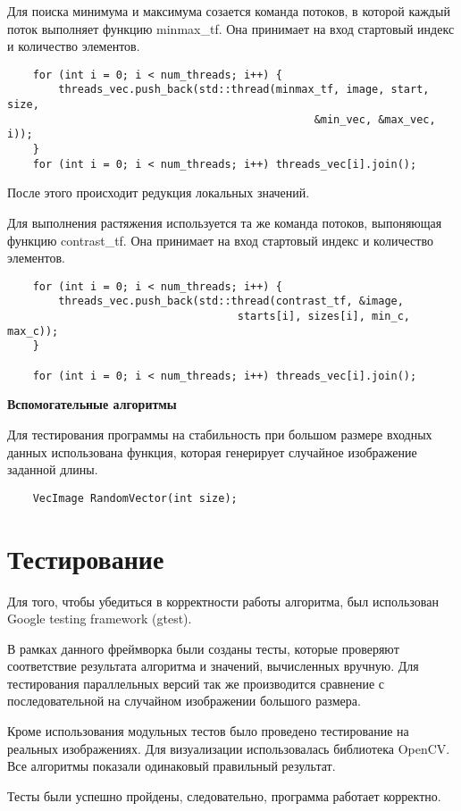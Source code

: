 \documentclass{report}
\begin{document}
    Для поиска минимума и максимума созается команда потоков, в которой каждый поток выполняет функцию minmax\_tf. Она принимает на вход стартовый индекс и количество элементов.
    \begin{lstlisting}
    for (int i = 0; i < num_threads; i++) {
        threads_vec.push_back(std::thread(minmax_tf, image, start, size,
                                                &min_vec, &max_vec, i));
    }
    for (int i = 0; i < num_threads; i++) threads_vec[i].join();
    \end{lstlisting}
    \par После этого происходит редукция локальных значений.
    \par Для выполнения растяжения используется та же команда потоков, выпоняющая функцию contrast\_tf. Она принимает на вход стартовый индекс и количество элементов.
    \begin{lstlisting}
    for (int i = 0; i < num_threads; i++) {
        threads_vec.push_back(std::thread(contrast_tf, &image,
                                    starts[i], sizes[i], min_c, max_c));
    }

    for (int i = 0; i < num_threads; i++) threads_vec[i].join();
    \end{lstlisting}
    \textbf{Вспомогательные алгоритмы}
    \par Для тестирования программы на стабильность при большом размере входных данных использована функция, которая генерирует случайное изображение заданной длины.
    \begin{lstlisting}
    VecImage RandomVector(int size);
    \end{lstlisting}
    
    \newpage
    \section*{Тестирование}
    \par Для того, чтобы убедиться в корректности работы алгоритма, был использован Google testing framework (gtest).
    \par В рамках данного фреймворка были созданы тесты, которые проверяют соответствие результата алгоритма и значений, вычисленных вручную. Для тестирования параллельных версий так же производится сравнение с последовательной на случайном изображении большого размера.
    \par Кроме использования модульных тестов было проведено тестирование на реальных изображениях. Для визуализации использовалась библиотека OpenCV. Все алгоритмы показали одинаковый правильный результат.
    \par Тесты были успешно пройдены, следовательно, программа работает корректно.
    
\end{document}
